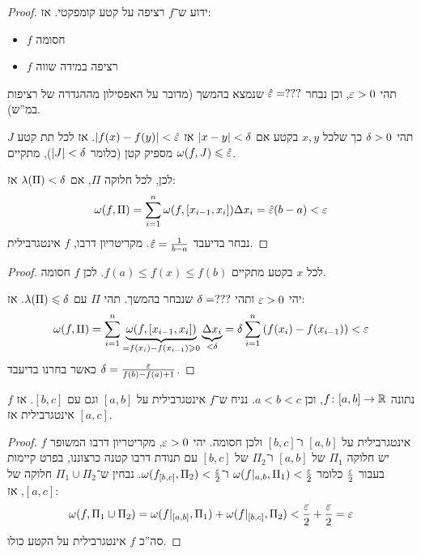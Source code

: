 \documentclass[name=רשימות חדו''א 2א]{../../../tex/classes/noChapterMegasumPreamble}
\begin{document}
	\begin{proof}
		ידוע ש־$f$ רציפה על קטע קומפקטי. אז:
		\begin{itemize}
			\item $f$ חסומה
			\item $f$ רציפה במידה שווה
		\end{itemize}
		תהי $\eg > 0$, וכן נבחר $\hat \eg = ???$ שנמצא בהמשך (מדובר על האפסילון מההגדרה של רציפות במ''ש).

		תהי $\delta > 0$ כך שלכל $x, y$ בקטע אם $\left \lvert x - y \right \rvert < \delta$ אז $\sof{f(x) - f(y)} < \hat \eg$. אז לכל תת קטע $J$ מספיק קטן (כלומר $\left \lvert J \right \rvert < \delta$), מתקיים $\wg(f, J) \le \hat \eg$.

		לכן, לכל חלוקה $\Pi$, אם $\lambda(\Pi) < \delta$ אז:
		\[ \wg(f, \Pi) = \sumnio \wg(f, [x_{i - 1}, x_i])\Delta x_i = \hat \eg(b - a) < \eg \]
		נבחר בדיעבד $\hat \eg = \frac{1}{b - a}$. מקריטריון דרבו, $f$ אינטגרבילית.
	\end{proof}

	\begin{proof}
		לכל $x$ בקטע מתקיים $f(a) \le f(x) \le f(b)$. לכן $f$ חסומה.

		יהי $\eg> 0$ ותהי $\delta = ???$ שנבחר בהמשך. תהי $\Pi$ עם $\lambda(\Pi) \leqslant \delta$. אז:
		\[ \wg(f, \Pi) = \sumnio \underbrace{\wg(f, [x_{i - 1}, x_i])}_{=f(x_i) - f(x_{i - 1}) \ge 0}\underbrace{\Delta x_i}_{< \dg} = \dg \sumnio \cl{f(x_i) - f(x_{i - 1})} < \eg \]
		כאשר בחרנו בדיעבד $\dg = \frac{\eg}{f(b) - f(a) + 1}$.
	\end{proof}

	\begin{Theorem}
		נתונה $f \colon [a, b] \to \mathbb{R}$, וכן $a < b < c$. נניח ש־$f$ אינטגרבילית על $[a, b]$ וגם עם $[b, c]$. אז $f$ אינטגרבילית אז $[a, c]$.
	\end{Theorem}
	\begin{proof}
		$f$ אינטגרבילית על $[a, b]$ ו־$[b, c]$ ולכן חסומה. יהי $\eg > 0$, מקריטריון דרבו המשופר יש חלוקה $\Pi_1$ של $[a, b]$ ו־$\Pi_2 $ של $[b, c]$ עם תנודת דרבו קטנה כרצוננו, בפרט קיימות בעבור $\frac{\eg}{2}$ כלומר $\wg(f|_{a, b}, \Pi_1) < \frac{\eg}{2}$ ו־$\wg(f_{[b, c]}, \Pi_2) < \frac{\eg}{2}$. נבחין ש־$\Pi_1 \cup \Pi_2$ חלוקה של $[a, c]$, אז:
		\[ \wg(f, \Pi_1 \cup \Pi_2)  = \wg(f|_{[a, b]}, \Pi_1) + \wg(f|_{[b, c]}, \Pi_2) < \frac{\eg}{2} + \frac{\eg}{2} = \eg \]
		סה''כ $f$ אינטגרבילית על הקטע כולו.
	\end{proof}
\end{document}
